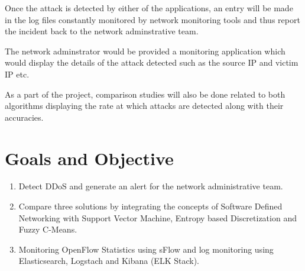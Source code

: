 \documentclass[12pt,a4paper,final]{report}
\begin{document}
Once the attack is detected by either of the applications, an entry will be made in the log files constantly monitored by network monitoring tools and thus report the incident back to the network adminstrative team.

The network adminstrator would be provided a monitoring application which would display the details of the attack detected such as the source IP and victim IP etc.

As a part of the project, comparison studies will also be done related to both algorithms displaying the rate at which attacks are detected along with their accuracies.


\section{Goals and Objective}
\begin{enumerate}
\item
Detect DDoS and generate an alert for the network administrative team.

\item
Compare three solutions by integrating the concepts of Software Defined Networking with Support Vector Machine, Entropy based Discretization and Fuzzy C-Means.

\item
Monitoring OpenFlow Statistics using sFlow and log monitoring using Elasticsearch, Logstach and Kibana (ELK Stack).
\end{enumerate}

\newpage
\end{document}
